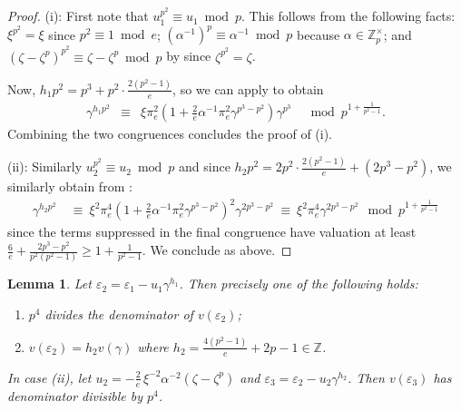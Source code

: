 \documentclass{amsart}
\newtheorem{lemma}[theorem]{Lemma}
\theoremstyle{definition}
\numberwithin{theorem}{section}
\numberwithin{equation}{section}
\begin{document}
\begin{proof}
(i): First note that $u_1^{p^2} \equiv u_1 \bmod{p}$. This follows from the following facts: $\xi^{p^2} = \xi$ since $p^2 \equiv 1 \bmod{e}$;  $(\alpha^{-1})^{p} \equiv \alpha^{-1} \bmod p$ because $\alpha \in \mathbb{Z}_p^\times$; and $(\zeta-\zeta^p)^{p^2} \equiv \zeta-\zeta^p \bmod{p}$ by  since $\zeta^{p^2}=\zeta$.

Now, $h_1p^2=p^3+p^2 \cdot \frac{2(p^2-1)}{e}$, so we can apply  to obtain
\begin{eqnarray*}
    \gamma^{h_1p^2} &\equiv& \xi\pi_e^2 \left(1+\tfrac{2}{e}\alpha^{-1}\pi_e^2\gamma^{p^3-p^2}\right) \gamma^{p^3} \quad \bmod{p^{1+\frac{1}{p^2-1}}}.
\end{eqnarray*}
Combining the two congruences concludes the proof of (i).

(ii): Similarly $u_2^{p^2} \equiv u_2 \bmod{p}$ and since $h_2p^2=2p^2 \cdot \frac{2(p^2-1)}{e} + (2p^3-p^2)$, we similarly obtain from :
\begin{align*}
    \gamma^{h_2p^2} \ &\equiv \ \xi^2\pi_e^4 \left(1+\frac{2}{e}\alpha^{-1}\pi_e^2\gamma^{p^3-p^2}\right)^2 \gamma^{2p^3-p^2} \ \equiv \ \xi^2\pi_e^4 \gamma^{2p^3-p^2} \mod p^{1+\frac{1}{p^2-1}}
\end{align*}
since the terms suppressed in the final congruence have valuation at least $\frac{6}{e} + \frac{2p^3-p^2}{p^2(p^2-1)} \geq 1 + \frac{1}{p^2-1}$. We conclude as above.
\end{proof}

\begin{lemma}\label{lem: epsilon2}
Let $\varepsilon_2=\varepsilon_1-u_1\gamma^{h_1}$. Then precisely one of the following holds:
\begin{enumerate}
    \item $p^4$ divides the denominator of $v(\varepsilon_2)$; 
    \item $v(\varepsilon_2)=h_2v(\gamma)$ where $h_2=\frac{4(p^2-1)}{e}  +2p-1\in \mathbb{Z}$.
\end{enumerate}
In case (ii), let $u_2=-\frac{2}{e} \,\xi^{-2}\alpha^{-2}(\zeta-\zeta^p)$ and $\varepsilon_3=\varepsilon_2-u_2\gamma^{h_2}$. Then $v(\varepsilon_3)$ has denominator divisible by $p^4$.
\end{lemma}
\end{document}
